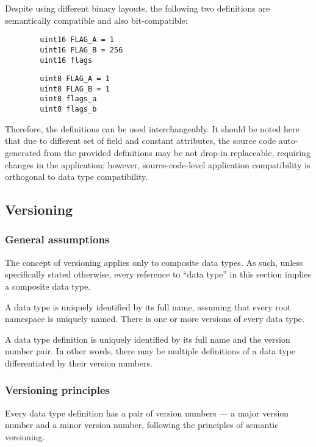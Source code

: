 \begin{remark}[breakable]
    Despite using different binary layouts, the following two definitions are semantically compatible
    and also bit-compatible:

    \begin{verbatim}
        uint16 FLAG_A = 1
        uint16 FLAG_B = 256
        uint16 flags
    \end{verbatim}

    \begin{verbatim}
        uint8 FLAG_A = 1
        uint8 FLAG_B = 1
        uint8 flags_a
        uint8 flags_b
    \end{verbatim}

    Therefore, the definitions can be used interchangeably.
    It should be noted here that due to different set of field and constant attributes,
    the source code auto-generated from the provided definitions may be not drop-in replaceable,
    requiring changes in the application;
    however, source-code-level application compatibility is orthogonal to data type compatibility.
\end{remark}

\subsection{Versioning}

\subsubsection{General assumptions}

The concept of versioning applies only to composite data types.
As such, unless specifically stated otherwise, every reference to ``data type''
in this section implies a composite data type.

A data type is uniquely identified by its full name,
assuming that every root namespace is uniquely named.
There is one or more versions of every data type.

A data type definition is uniquely identified by its full name and the version number pair.
In other words, there may be multiple definitions of a data type differentiated by their version numbers.

\subsubsection{Versioning principles}

Every data type definition has a pair of version numbers ---
a major version number and a minor version number, following the principles of semantic versioning.

